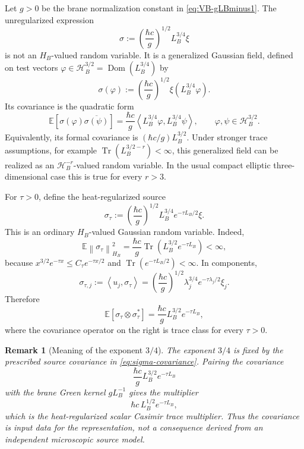 \documentclass[11pt]{article}
\newtheorem{remark}[theorem]{Remark}
\newcommand{\E}{\mathbb{E}}
\newcommand{\Tr}{\operatorname{Tr}}
\newcommand{\Dom}{\operatorname{Dom}}
\newcommand{\braket}[2]{\left\langle #1,#2\right\rangle}
\newcommand{\norm}[1]{\left\lVert #1\right\rVert}
\begin{document}
Let $g>0$ be the brane normalization constant in \eqref{eq:VB-gLBminus1}.  The unregularized expression
\[
    \sigma:=\left(\frac{\hbar c}{g}\right)^{1/2}L_B^{3/4}\xi
\]
is not an $H_B$-valued random variable.  It is a generalized Gaussian field, defined on test vectors $\varphi\in\mathcal H_B^{3/2}=\Dom(L_B^{3/4})$ by
\[
    \sigma(\varphi)
    :=\left(\frac{\hbar c}{g}\right)^{1/2}\xi(L_B^{3/4}\varphi).
\]
Its covariance is the quadratic form
\[
    \E[\sigma(\varphi)\overline{\sigma(\psi)}]
    =\frac{\hbar c}{g}\braket{L_B^{3/4}\varphi}{L_B^{3/4}\psi},
    \qquad \varphi,\psi\in\mathcal H_B^{3/2}.
\]
Equivalently, its formal covariance is $(\hbar c/g)L_B^{3/2}$.  Under stronger trace assumptions, for example $\Tr(L_B^{3/2-r})<\infty$, this generalized field can be realized as an $\mathcal H_B^{-r}$-valued random variable.  In the usual compact elliptic three-dimensional case this is true for every $r>3$.

For $\tau>0$, define the heat-regularized source
\begin{equation}
    \sigma_\tau
    :=\left(\frac{\hbar c}{g}\right)^{1/2}L_B^{3/4}e^{-\tau L_B/2}\xi.
    \label{eq:sigma-tau}
\end{equation}
This is an ordinary $H_B$-valued Gaussian random variable.  Indeed,
\[
    \E\norm{\sigma_\tau}_{H_B}^2
    =\frac{\hbar c}{g}\Tr(L_B^{3/2}e^{-\tau L_B})<\infty,
\]
because $x^{3/2}e^{-\tau x}\leq C_\tau e^{-\tau x/2}$ and $\Tr(e^{-\tau L_B/2})<\infty$.  In components,
\begin{equation}
    \sigma_{\tau,j}:=\braket{u_j}{\sigma_\tau}
    =\left(\frac{\hbar c}{g}\right)^{1/2}\lambda_j^{3/4}e^{-\tau\lambda_j/2}\xi_j.
    \label{eq:sigma-components}
\end{equation}
Therefore
\begin{equation}
    \E[\sigma_\tau\otimes\sigma_\tau^*]
    =\frac{\hbar c}{g}L_B^{3/2}e^{-\tau L_B},
    \label{eq:sigma-covariance}
\end{equation}
where the covariance operator on the right is trace class for every $\tau>0$.

\begin{remark}[Meaning of the exponent \(3/4\)]
The exponent \(3/4\) is fixed by the prescribed source covariance in
\eqref{eq:sigma-covariance}.  Pairing the covariance
\[
    \frac{\hbar c}{g}L_B^{3/2}e^{-\tau L_B}
\]
with the brane Green kernel \(gL_B^{-1}\) gives the multiplier
\[
    \hbar c\,L_B^{1/2}e^{-\tau L_B},
\]
which is the heat-regularized scalar Casimir trace multiplier.  Thus the
covariance is input data for the representation, not a consequence derived
from an independent microscopic source model.
\end{remark}
\end{document}
